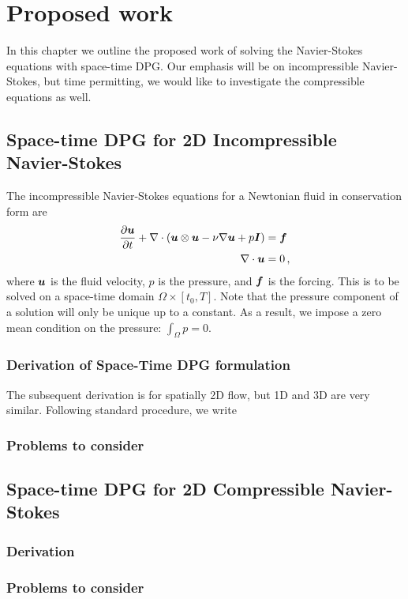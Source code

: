 \documentclass[Proposal.tex]{subfiles}
\begin{document}
\chapter{Proposed work}
In this chapter we outline the proposed work of solving the Navier-Stokes equations with space-time DPG. 
Our emphasis will be on incompressible Navier-Stokes, but time permitting, we would like to investigate the compressible equations as well.


\section{Space-time DPG for 2D Incompressible Navier-Stokes}
The incompressible Navier-Stokes equations for a Newtonian fluid in conservation form are
\begin{align*}
  \frac{\partial\boldsymbol u}{\partial t}+\nabla\cdot\left( \boldsymbol u\otimes\boldsymbol u-\nu\nabla\boldsymbol u+p\boldsymbol I \right)&=\boldsymbol f\\
  \nabla\cdot\boldsymbol u&=0\,,
\end{align*}
where $\boldsymbol u$ is the fluid velocity, $p$ is the pressure, and $\boldsymbol f$ is the forcing. 
This is to be solved on a space-time domain $\Omega\times[t_0,T]$.
Note that the pressure component of a solution will only be unique up to a constant. 
As a result, we impose a zero mean condition on the pressure: $\int_\Omega p=0$.

\subsection{Derivation of Space-Time DPG formulation}
The subsequent derivation is for spatially 2D flow, but 1D and 3D are very similar.
Following standard procedure, we write

\subsection{Problems to consider}


\section{Space-time DPG for 2D Compressible Navier-Stokes}

\subsection{Derivation}

\subsection{Problems to consider}
\end{document}
